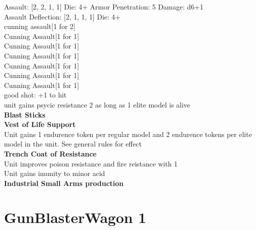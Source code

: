 Assault: [2, 2, 1, 1] Die: 4+ Armor Penetration: 5 Damage: d6+1 \\
Assault Deflection: [2, 1, 1, 1] Die: 4+\\
\indent cunning assault[1 for 2]\\ 
Cunning Assault[1 for 1]\\ 
Cunning Assault[1 for 1]\\ 
Cunning Assault[1 for 1]\\ 
Cunning Assault[1 for 1]\\ 
Cunning Assault[1 for 1]\\ 
Cunning Assault[1 for 1]\\ 
 

good shot: +1 to hit\\ 
unit gains psycic resistance 2 as long as 1 elite model is alive\\ 


{\bf Blast Sticks } \\






{\bf Vest of Life Support } \\

Unit gains 1 endurence token per regular model  and 2 endurence tokens per elite model in the unit. See general rules for effect\\ 





{\bf Trench Coat of Resistance } \\

Unit improves poison resistance and fire reistance with 1\\ 
Unit gains imunity to minor acid\\ 





{\bf Industrial Small Arms production } \\






 















\clearpage

\section{ GunBlasterWagon 1 }

